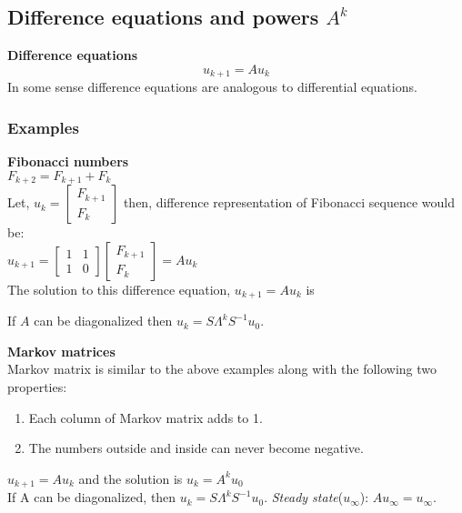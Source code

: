 \subsection{Difference equations and powers $A^k$}
\textbf{Difference equations}
$$u_{k+1} = Au_k$$
In some sense difference equations are analogous to differential equations.

\subsubsection{Examples}

\textbf{Fibonacci numbers}\\

$F_{k+2} = F_{k+1} + F_k$\\

Let, 
$
u_k = 
\begin{bmatrix}
F_{k+1}\\
F_k
\end{bmatrix}
$
then, difference representation of Fibonacci sequence would be:\\
$
u_{k+1} = 
\begin{bmatrix}
1 & 1 \\
1 & 0
\end{bmatrix}
\begin{bmatrix}
F_{k+1}\\
F_k	
\end{bmatrix}
= Au_k
$\\
The solution to this difference equation, $u_{k+1} = Au_k$ is \\
\begin{center}
\end{center}
If $A$ can be diagonalized then $u_k = S\Lambda^kS^{-1}u_0$. \\

\vspace{6pt}

\textbf{Markov matrices}\\
Markov matrix is similar to the above examples along with the following two properties:\\
\begin{enumerate}
\item Each column of Markov matrix adds to 1.
\item The numbers outside and inside can never become negative.
\end{enumerate}
$u_{k+1} = Au_k$  and the solution is $u_k = A^ku_0$\\
If A can be diagonalized, then $u_k = S\Lambda^kS^{-1}u_0$.
\textit{Steady state}($u_{\infty}$): $Au_{\infty} = u_{\infty}$.

